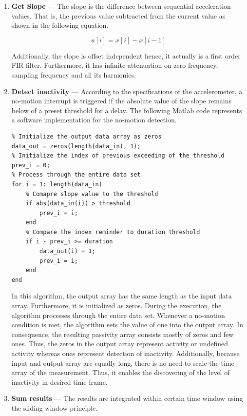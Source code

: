 \documentclass[english,12pt,a4paper,pdftex,elec,utf8]{aaltothesis}
\begin{document}
\begin{enumerate}
\item \textbf{Get Slope} --- The slope is the difference between sequential acceleration values. That is, the previous value subtracted from the current value as shown in the following equation. 

\begin{equation}
u[i] = x[i] - x[i-1]
\end{equation}

Additionally, the slope is offset independent hence, it actually is a first order FIR filter. Furthermore, it has infinite attenuation on zero frequency, sampling frequency and all its harmonics. 

\item \textbf{Detect inactivity} --- According to the specifications of the accelerometer, a no-motion interrupt is triggered if the absolute value of the slope remains below of a preset threshold for a delay. The following Matlab code represents a software implementation for the no-motion detection. 

\begin{lstlisting}
% Initialize the output data array as zeros
data_out = zeros(length(data_in), 1);
% Initialize the index of previous exceeding of the threshold
prev_i = 0; 
% Process through the entire data set
for i = 1: length(data_in)
	% Comapre slope value to the threshold
    if abs(data_in(i)) > threshold
        prev_i = i;
    end
    % Compare the index reminder to duration threshold
    if i - prev_i >= duration
        data_out(i) = 1;
        prev_i = i;
    end
end	
\end{lstlisting}

In this algorithm, the output array has the same length as the input data array. Furthermore, it is initialized as zeros. During the execution, the algorithm processes through the entire data set. Whenever a no-motion condition is met, the algorithm sets the value of one into the output array. In consequence, the resulting passivity array consists mostly of zeros and few ones. Thus, the zeros in the output array represent activity or undefined activity whereas ones represent detection of inactivity. Additionally, because input and output array are equally long, there is no need to scale the time array of the measurement. Thus, it enables the discovering of the level of inactivity in desired time frame.


\item \textbf{Sum results} --- The results are integrated within certain time window using the sliding window principle.


\end{enumerate}
\end{document}
